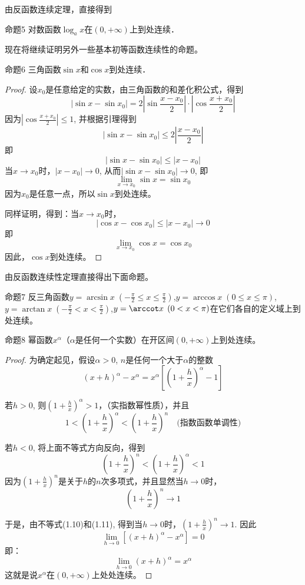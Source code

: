 由反函数连续定理，直接得到

\begin{blk}
    {命题5} 对数函数$\log_a x$在$(0,+\infty)$上到处连续．
\end{blk}

现在将继续证明另外一些基本初等函数连续性的命题。

\begin{blk}
    {命题6} 三角函数$\sin x$和$\cos x$到处连续．
\end{blk}

\begin{proof}
设$x_0$是任意给定的实数，由三角函数的和差化积公式，得到
\[|\sin x-\sin x_0|=2\left|\sin\frac{x-x_0}{2}\right| \cdot \left|\cos \frac{x+x_0}{2}\right|\]
因为$\left|\cos\frac{x+x_0}{2}\right|\le 1$, 并根据引理得到
\[|\sin x-\sin x_0|\le 2\left|\frac{x-x_0}{2}\right|\]
即
\[|\sin x-\sin x_0|\le \left|x-x_0\right|\]
当$x\to x_0$时，$|x-x_0|\to 0$, 从而$|\sin x-\sin x_0|\to 0$, 即
\[\lim_{x\to x_0} \sin x=\sin x_0\]
因为$x_0$是任意一点，所以$\sin x$到处连续。

同样证明，得到：当$x\to x_0$时，
\[|\cos x-\cos x_0|\le |x-x_0|\to 0\]
即
\[\lim_{x\to x_0} \cos x=\cos x_0\]
因此，$\cos x$到处连续。
\end{proof}
 
由反函数连续性定理直接得出下面命题。

\begin{blk}
    {命题7} 反三角函数$y=\arcsin x\; \left(-\frac{\pi}{2}\le x\le \frac{\pi}{2}\right)$,\quad $y=\arccos x\; \left(0\le x\le \pi\right)$,\quad $y=\arctan x\; \left(-\frac{\pi}{2}< x< \frac{\pi}{2}\right)$,\quad $y=\arccot x\; \left(0<x<\pi\right)$在它们各自的定义域上到处连续。
\end{blk}

\begin{blk}{命题8}
幂函数$x^{\alpha}$（$\alpha$是任何一个实数）在开区间$(0,+\infty)$上到处连续。
\end{blk}

\begin{proof}
为确定起见，假设$\alpha>0$, $n$是任何一个大于$\alpha$的整数
\[(x+h)^{\alpha} -x^{\alpha}=x^{\alpha} \left[ \left(1+\frac{h}{x}\right)^{\alpha} -1\right] \]

若$h>0$, 则$\left(1+\frac{h}{x}\right)^{\alpha} >1$，（实指数幂性质），并且
\begin{equation}
    1<\left(1+\frac{h}{x}\right)^{\alpha}<\left(1+\frac{h}{x}\right)^{n}\quad \text{(指数函数单调性)}
\end{equation}

若$h<0$, 将上面不等式方向反向，得到
\begin{equation}
    \left(1+\frac{h}{x}\right)^{n}<\left(1+\frac{h}{x}\right)^{\alpha}<1
\end{equation}
因为$\left(1+\frac{h}{x}\right)^{n}$是关于$h$的$n$次多项式，并且显然当$h\to 0$时，
\[\left(1+\frac{h}{x}\right)^{n}\to 1\]

于是，由不等式(1.10)和(1.11), 得到当$h\to 0$时，$\left(1+\frac{h}{x}\right)^{n}\to 1$. 因此
\[\lim_{h\to 0}\left[(x+h)^{\alpha}-x^{\alpha}\right]=0\]
即：
\[\lim_{h\to 0}(x+h)^{\alpha}=x^{\alpha}\]
这就是说$x^{\alpha}$在$(0,+\infty)$上处处连续。
\end{proof}

